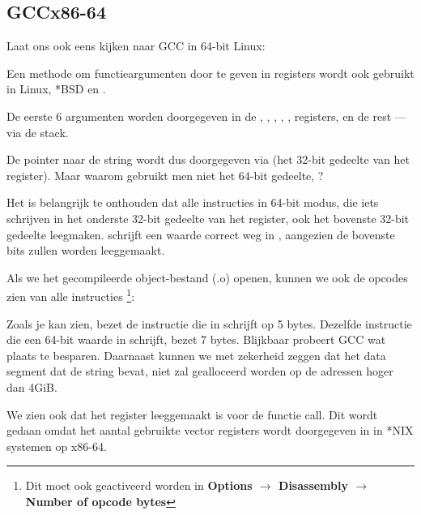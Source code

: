 \subsection{GCC\EMDASH{}x86-64}

Laat ons ook eens kijken naar GCC in 64-bit Linux:



Een methode om functieargumenten door te geven in registers wordt ook gebruikt in Linux, *BSD en \MacOSX \SysVABI.

De eerste 6 argumenten worden doorgegeven in de \RDI, \RSI, \RDX, \RCX, ,  registers, en de rest --- via de stack.

De pointer naar de string wordt dus doorgegeven via \EDI (het 32-bit gedeelte van het register).
Maar waarom gebruikt men niet het 64-bit gedeelte, \RDI?

Het is belangrijk te onthouden dat alle \MOV instructies in 64-bit modus, die iets schrijven in het onderste 32-bit gedeelte van het register, ook het bovenste 32-bit gedeelte leegmaken.
 schrijft een waarde correct weg in \RAX, aangezien de bovenste bits zullen worden leeggemaakt.

Als we het gecompileerde object-bestand (.o) openen, kunnen we ook de opcodes zien van alle instructies
\footnote{Dit moet ook geactiveerd worden in \textbf{Options $\rightarrow$ Disassembly $\rightarrow$ Number of opcode bytes}}:



\label{hw_EDI_instead_of_RDI}
Zoals je kan zien, bezet de instructie die in \EDI schrijft op  5 bytes.
Dezelfde instructie die een 64-bit waarde in \RDI schrijft, bezet 7 bytes.
Blijkbaar probeert GCC wat plaats te besparen.
Daarnaast kunnen we met zekerheid zeggen dat het data segment dat de string bevat, niet zal gealloceerd worden op de adressen hoger dan 4\gls{GiB}.

\label{SysVABI_input_EAX}
We zien ook dat het \EAX register leeggemaakt is voor de \printf functie call.
Dit wordt gedaan omdat het aantal gebruikte vector registers wordt doorgegeven in \EAX in *NIX systemen op x86-64.

